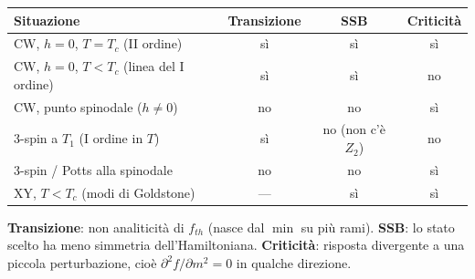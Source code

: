 \begin{center}
\renewcommand{\arraystretch}{1.3}
\begin{tabular}{|l|c|c|c|}
\hline
\textbf{Situazione} & \textbf{Transizione} & \textbf{SSB} & \textbf{Criticità} \\
\hline
CW, $h=0$, $T=T_c$ (II ordine) & sì & sì & sì \\
CW, $h=0$, $T<T_c$ (linea del I ordine) & sì & sì & no \\
CW, punto spinodale ($h \neq 0$) & no & no & sì \\
3-spin a $T_1$ (I ordine in $T$) & sì & no (non c'è $Z_2$) & no \\
3-spin / Potts alla spinodale & no & no & sì \\
XY, $T<T_c$ (modi di Goldstone) & --- & sì & sì \\
\hline
\end{tabular}
\end{center}

\noindent \textbf{Transizione}: non analiticità di $f_{th}$ (nasce dal $\min$ su più rami). \textbf{SSB}: lo stato scelto ha meno simmetria dell'Hamiltoniana. \textbf{Criticità}: risposta divergente a una piccola perturbazione, cioè $\partial^2 f / \partial m^2 = 0$ in qualche direzione.

